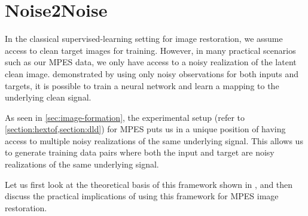 


\section{Noise2Noise}
In the classical supervised-learning setting for image restoration, we assume access to clean target images for training. However, in many practical scenarios such as our \gls{MPES} data, we only have access to a noisy realization of the latent clean image. \citeauthor{lehtinenNoise2NoiseLearningImage2018} demonstrated by using only noisy observations for both inputs and targets, it is possible to train a neural network and learn a mapping to the underlying clean signal. 

As seen in \cref{sec:image-formation}, the experimental setup (refer to \cref{section:hextof,section:dld}) for \gls{MPES} puts us in a unique position of having access to multiple noisy realizations of the same underlying signal. This allows us to generate training data pairs where both the input and target are noisy realizations of the same underlying signal.

Let us first look at the theoretical basis of this framework shown in \cite{lehtinenNoise2NoiseLearningImage2018}, and then discuss the practical implications of using this framework for \gls{MPES} image restoration.

